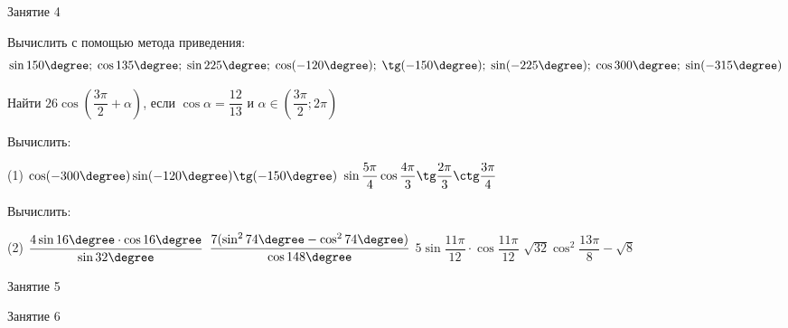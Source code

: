 \begin{class}[number=4]
	\begin{listofex}
		\item Занятие 4
	\end{listofex}
\end{class}

\begin{homework}[number=2]
	\begin{listofex}
		\item Вычислить с помощью метода приведения: \[ \sin150\degree;\;\cos135\degree;\;\sin225\degree;\;\cos(-120\degree);\;\tg(-150\degree);\;\sin(-225\degree);\;\cos300\degree;\;\sin(-315\degree) \]
		\item Найти \( 26\cos\left( \dfrac{3\pi}{2}+\alpha \right) \), \quad если \( \cos\alpha=\dfrac{12}{13} \) и \( \alpha\in\left( \dfrac{3\pi}{2}; 2\pi \right) \)
		\item Вычислить:
		\begin{tasks}(1)
			\task \( \cos(-300\degree)\sin(-120\degree)\tg(-150\degree) \)
			\task \( \sin\dfrac{5\pi}{4}\cos\dfrac{4\pi}{3}\tg\dfrac{2\pi}{3}\ctg\dfrac{3\pi}{4} \)
		\end{tasks}
		\item Вычислить:
		\begin{tasks}(2)
			\task \( \dfrac{4\sin16\degree\cdot\cos16\degree}{\sin32\degree} \)
			\task \( \dfrac{7(\sin^274\degree-\cos^274\degree)}{\cos148\degree} \)
			\task \( 5\sin\dfrac{11\pi}{12}\cdot\cos\dfrac{11\pi}{12} \)
			\task \( \sqrt{32}\cos^2\dfrac{13\pi}{8}-\sqrt{8} \)
		\end{tasks}
	\end{listofex}
\end{homework}

\begin{class}[number=5]
	\begin{listofex}
		\item Занятие 5
	\end{listofex}
	\end{class}
	
	\begin{class}[number=6]
		\begin{listofex}
			\item Занятие 6
		\end{listofex}
	\end{class}
	
